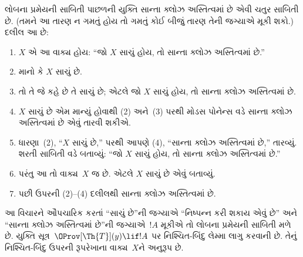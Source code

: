 \begin{explain}
લોબના પ્રમેયની સાબિતી પાછળની યુક્તિ સાન્તા ક્લોઝ અસ્તિત્વમાં છે એવી ચતુર સાબિતી છે. (તમને આ તારણ ન ગમતું હોય તો ગમતું કોઈ બીજું તારણ તેની જગ્યાએ મૂકી શકો.) દલીલ આ છે:
\begin{enumerate}
\item $X$ એ આ વાક્ય હોય: ``જો $X$ સાચું હોય, તો સાન્તા ક્લોઝ અસ્તિત્વમાં છે.''
\item માનો કે $X$ સાચું છે.
\item તો તે જે કહે છે તે સાચું છે; એટલે જો $X$ સાચું હોય, તો સાન્તા ક્લોઝ અસ્તિત્વમાં છે.
\item $X$ સાચું છે એમ માન્યું હોવાથી (2) અને~(3) પરથી મોડસ પોનેન્સ વડે સાન્તા ક્લોઝ અસ્તિત્વમાં છે એવું તારવી શકીએ.
\item ધારણા~(2), ``$X$ સાચું છે,'' પરથી આપણે (4), ``સાન્તા ક્લોઝ અસ્તિત્વમાં છે,'' તારવ્યું. શરતી સાબિતી વડે બતાવ્યું: ``જો $X$ સાચું હોય, તો સાન્તા ક્લોઝ અસ્તિત્વમાં છે.''
\item પરંતુ આ તો વાક્ય~$X$ જ છે. એટલે $X$ સાચું છે એવું બતાવ્યું.
\item પછી ઉપરની (2)--(4) દલીલથી સાન્તા ક્લોઝ અસ્તિત્વમાં છે.
\end{enumerate}
આ વિચારને ઔપચારિક કરતાં ``સાચું છે''ની જગ્યાએ ``નિષ્પન્ન કરી શકાય એવું છે'' અને ``સાન્તા ક્લોઝ અસ્તિત્વમાં છે''ની જગ્યાએ~$!A$ મૂકીએ તો લોબના પ્રમેયની સાબિતી મળે છે. યુક્તિ સૂત્ર~$\OProv[\Th{T}](y) \lif !A$ પર નિશ્ચિત-બિંદુ લેમ્મા લાગુ કરવાની છે. તેનું નિશ્ચિત-બિંદુ ઉપરની રૂપરેખાના વાક્ય~$X$ને અનુરૂપ છે.
\end{explain}

